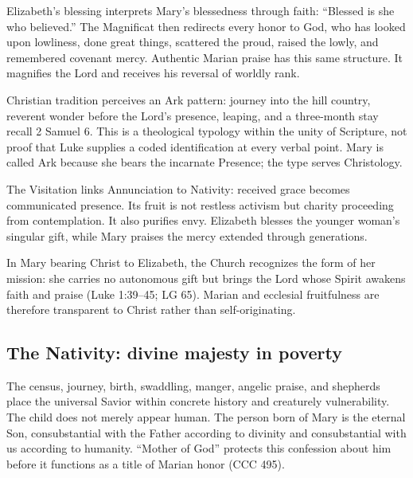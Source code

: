 Elizabeth's blessing interprets Mary's blessedness through faith: ``Blessed is she who believed.'' The Magnificat then redirects every honor to God, who has looked upon lowliness, done great things, scattered the proud, raised the lowly, and remembered covenant mercy. Authentic Marian praise has this same structure. It magnifies the Lord and receives his reversal of worldly rank.

Christian tradition perceives an Ark pattern: journey into the hill country, reverent wonder before the Lord's presence, leaping, and a three-month stay recall 2 Samuel 6. This is a theological typology within the unity of Scripture, not proof that Luke supplies a coded identification at every verbal point. Mary is called Ark because she bears the incarnate Presence; the type serves Christology.

The Visitation links Annunciation to Nativity: received grace becomes communicated presence. Its fruit is not restless activism but charity proceeding from contemplation. It also purifies envy. Elizabeth blesses the younger woman's singular gift, while Mary praises the mercy extended through generations.

In Mary bearing Christ to Elizabeth, the Church recognizes the form of her mission: she carries no autonomous gift but brings the Lord whose Spirit awakens faith and praise (Luke 1:39--45; LG 65). Marian and ecclesial fruitfulness are therefore transparent to Christ rather than self-originating.

\subsection{The Nativity: divine majesty in poverty}


The census, journey, birth, swaddling, manger, angelic praise, and shepherds place the universal Savior within concrete history and creaturely vulnerability. The child does not merely appear human. The person born of Mary is the eternal Son, consubstantial with the Father according to divinity and consubstantial with us according to humanity. ``Mother of God'' protects this confession about him before it functions as a title of Marian honor (CCC 495).


